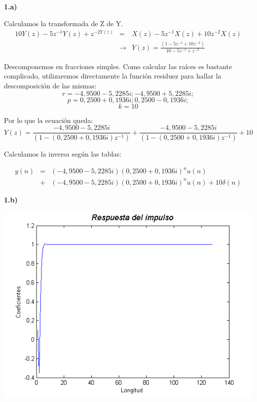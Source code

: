 \documentclass[a4paper,12pt]{article}
\begin{document}
\textbf{1.a)}

Calculamos la transformada de Z de Y. \\

\begin{eqnarray*}
10 Y(z) - 5 z^{-1} Y(z) + z^{-2Y(z)} & = & X(z) - 5 z^{-1} X(z) + 10 z^{-2} X(z) \\ & \rightarrow & Y(z) = \frac{(1 - 5 z^{-1} + 10 z^{-2})}{10 - 5 z^{-1} + z^{-2}}
\end{eqnarray*}

Descomponemos en fracciones simples. Como calcular las raíces es bastante complicado, utilizaremos directamente la función residuez para hallar la descomposición de las mismas: \\



$$ r = -4,9500 - 5,2285i; -4,9500 + 5,2285i; $$
$$ p = 0,2500 + 0,1936i; 0,2500 - 0,1936i; $$
$$ k = 10 $$

Por lo que la ecuación queda: \\

$$ Y(z) = \frac{-4,9500 - 5,2285i}{(1 - (0,2500 + 0,1936i)z^{-1})} + \frac{-4,9500 - 5,2285i}{(1 - (0,2500 + 0,1936i)z^{-1})} + 10 $$

Calculamos la inversa según las tablas:

\begin{eqnarray*}
y(n) & = & (-4,9500 - 5,2285i)(0,2500 + 0,1936i)^n u(n) \\ & + & (-4,9500 - 5,2285i)(0,2500 + 0,1936i)^n u(n) + 10 \delta(n)
\end{eqnarray*}

\textbf{1.b)} \\

\begin{center}
\includegraphics[width=.8 \textwidth]{ejercicio-4-4-b.png}
\end{center}
\end{document}
